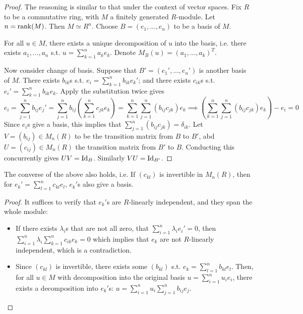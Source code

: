 \begin{proof}
    The reasoning is similar to that under the context of vector spaces. Fix $R$ to be a commutative ring, with $M$ a finitely generated $R$-module. Let $n = \mathrm{rank}(M)$. Then $M \simeq R^n$. Choose $B = (e_1, \ldots, e_n)$ to be a basis of $M$. 

    For all $u\in M$, there exists a unique decomposition of $u$ into the basis, i.e. there exists $a_1, \ldots, a_n$ s.t. $u = \sum_{k=1}^n a_k e_k$. Denote $M_B(u) = (a_1, \ldots, a_k)^T$. 

    Now consider change of basis. Suppose that $B' = (e_1', \ldots, e_n')$ is another basis of $M$. There exists $b_{ik}$s s.t. $e_i = \sum_{k=1}^n b_{ik} e_k'$; and there exists $c_{ik}$s s.t. $e_i' = \sum_{k=1}^n b_{ik} e_k$. Apply the substitution twice gives
    \[
        e_i = \sum\limits_{j=1}^n b_{ij} e_j' = \sum\limits_{j=1}^n b_{ij} \left( \sum\limits_{k=1}^n c_{jk} e_k \right) = \sum\limits_{k=1}^n \sum\limits_{j=1}^n (b_{ij} c_{jk}) e_k \implies \left(\sum\limits_{k=1}^n \sum\limits_{j=1}^n (b_{ij} c_{jk}) e_k\right) - e_i = 0
    \]
    Since $e_i$s give a basis, this implies that $\sum_{j=1}^n (b_{ij} c_{jk}) = \delta_{ik}$. Let $V = (b_{ij}) \in M_n(R)$ to be the transition matrix from $B$ to $B'$, abd $U = (c_{ij}) \in M_n(R)$ the transition matrix from $B'$ to $B$. Conducting this concurrently gives $UV = \mathrm{Id}_{B}$. Similarly $VU = \mathrm{Id}_{B'}$.
\end{proof}

\begin{proposition}
    The converse of the above also holds, i.e. If $(c_{kl})$ is invertible in $M_n(R)$, then for $e_k' = \sum_{l=1}^n c_{kl} e_l$, $e_k'$s also give a basis. 
\end{proposition}

\begin{proof}
    It suffices to verify that $e_k'$s are $R$-linearly independent, and they span the whole module:
    \begin{itemize}
        \item If there exists $\lambda_i$s that are not all zero, that $\sum_{i=1}^n \lambda_i e_i' = 0$, then $\sum_{i=1}^n \lambda_i \sum_{k=1}^n c_{ik} e_k = 0$ which implies that $e_k$ are not $R$-linearly independent, which is a contradiction.
        \item Since $(c_{kl})$ is invertible, there exists some $(b_{kl})$ s.t. $e_k = \sum_{l=1}^n b_{kl} e_l$. Then, for all $u\in M$ with decomposition into the original basis $u = \sum_{i=1}^n u_i e_i$, there exists a decomposition into $e_k'$s: $u = \sum_{i=1}^n u_i \sum_{j=1}^n b_{ij} e_j$. 
    \end{itemize}
\end{proof}

